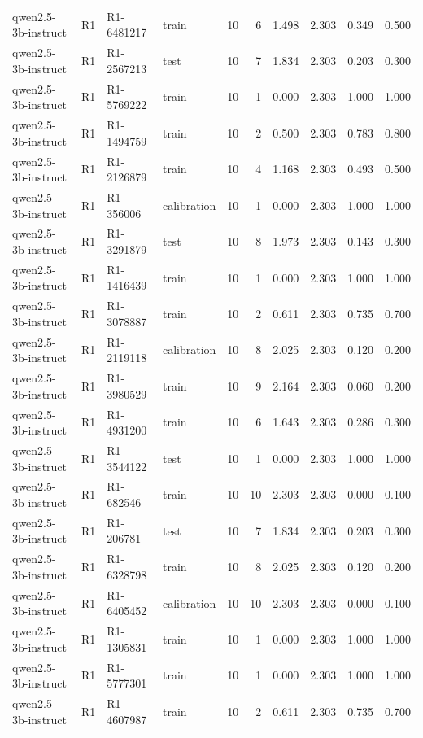 \begin{table}
\begin{tabular}{llllrrrrrr}
qwen2.5-3b-instruct & R1 & R1-6481217 & train & 10 & 6 & 1.498 & 2.303 & 0.349 & 0.500 \\
qwen2.5-3b-instruct & R1 & R1-2567213 & test & 10 & 7 & 1.834 & 2.303 & 0.203 & 0.300 \\
qwen2.5-3b-instruct & R1 & R1-5769222 & train & 10 & 1 & 0.000 & 2.303 & 1.000 & 1.000 \\
qwen2.5-3b-instruct & R1 & R1-1494759 & train & 10 & 2 & 0.500 & 2.303 & 0.783 & 0.800 \\
qwen2.5-3b-instruct & R1 & R1-2126879 & train & 10 & 4 & 1.168 & 2.303 & 0.493 & 0.500 \\
qwen2.5-3b-instruct & R1 & R1-356006 & calibration & 10 & 1 & 0.000 & 2.303 & 1.000 & 1.000 \\
qwen2.5-3b-instruct & R1 & R1-3291879 & test & 10 & 8 & 1.973 & 2.303 & 0.143 & 0.300 \\
qwen2.5-3b-instruct & R1 & R1-1416439 & train & 10 & 1 & 0.000 & 2.303 & 1.000 & 1.000 \\
qwen2.5-3b-instruct & R1 & R1-3078887 & train & 10 & 2 & 0.611 & 2.303 & 0.735 & 0.700 \\
qwen2.5-3b-instruct & R1 & R1-2119118 & calibration & 10 & 8 & 2.025 & 2.303 & 0.120 & 0.200 \\
qwen2.5-3b-instruct & R1 & R1-3980529 & train & 10 & 9 & 2.164 & 2.303 & 0.060 & 0.200 \\
qwen2.5-3b-instruct & R1 & R1-4931200 & train & 10 & 6 & 1.643 & 2.303 & 0.286 & 0.300 \\
qwen2.5-3b-instruct & R1 & R1-3544122 & test & 10 & 1 & 0.000 & 2.303 & 1.000 & 1.000 \\
qwen2.5-3b-instruct & R1 & R1-682546 & train & 10 & 10 & 2.303 & 2.303 & 0.000 & 0.100 \\
qwen2.5-3b-instruct & R1 & R1-206781 & test & 10 & 7 & 1.834 & 2.303 & 0.203 & 0.300 \\
qwen2.5-3b-instruct & R1 & R1-6328798 & train & 10 & 8 & 2.025 & 2.303 & 0.120 & 0.200 \\
qwen2.5-3b-instruct & R1 & R1-6405452 & calibration & 10 & 10 & 2.303 & 2.303 & 0.000 & 0.100 \\
qwen2.5-3b-instruct & R1 & R1-1305831 & train & 10 & 1 & 0.000 & 2.303 & 1.000 & 1.000 \\
qwen2.5-3b-instruct & R1 & R1-5777301 & train & 10 & 1 & 0.000 & 2.303 & 1.000 & 1.000 \\
qwen2.5-3b-instruct & R1 & R1-4607987 & train & 10 & 2 & 0.611 & 2.303 & 0.735 & 0.700 \\

\end{tabular}
\end{table}
